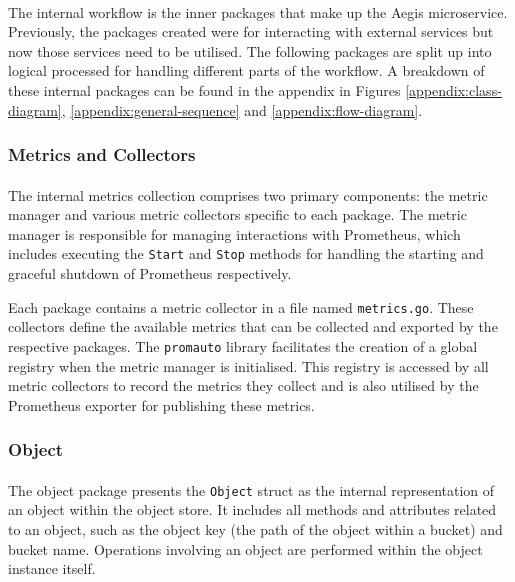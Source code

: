 \documentclass[12pt, conference, final, a4paper, onecolumn, compsoc]{IEEEtran}
\begin{document}
\paragraph{}
The internal workflow is the inner packages that make up the Aegis microservice.
Previously, the packages created were for interacting with external services but
now those services need to be utilised. The following packages are split up into
logical processed for handling different parts of the workflow. A breakdown of
these internal packages can be found in the appendix in Figures
\ref{appendix:class-diagram}, \ref{appendix:general-sequence} and \ref{appendix:flow-diagram}.

\subsubsection*{Metrics and Collectors}
\paragraph{}

The internal metrics collection comprises two primary components: the metric
manager and various metric collectors specific to each package. The metric
manager is responsible for managing interactions with Prometheus, which includes
executing the \texttt{Start} and \texttt{Stop} methods for handling the starting
and graceful shutdown of Prometheus respectively.

Each package contains a metric collector in a file named \texttt{metrics.go}.
These collectors define the available metrics that can be collected and exported
by the respective packages. The \texttt{promauto} library facilitates the
creation of a global registry when the metric manager is initialised. This
registry is accessed by all metric collectors to record the metrics they collect
and is also utilised by the Prometheus exporter for publishing these metrics.

\subsubsection*{Object}
\paragraph{}

The object package presents the \texttt{Object} struct as the internal
representation of an object within the object store. It includes all methods and
attributes related to an object, such as the object key (the path of the object
within a bucket) and bucket name.
Operations involving an object are performed within the object instance itself.
\end{document}
